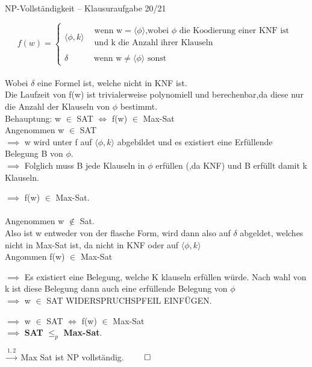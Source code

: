 \documentclass[answers]{submit}
\begin{document}
\begin{exercise}[6]{NP-Vollständigkeit -- Klausuraufgabe 20/21}
{    $$f(w)=\begin{cases}
        \langle \phi,k\rangle &
        \begin{array}{l}
          \text{wenn w} = \langle \phi \rangle \text{,wobei } \phi \text{ die Koodierung einer KNF ist} \\
          \text{und k die Anzahl ihrer Klauseln}                                                        \\
        \end{array} \\
        \delta                & \text{ wenn w} \neq \langle \phi \rangle \text{ sonst}
      \end{cases}$$ \\

    Wobei $\delta$ eine Formel ist, welche nicht in KNF ist. \\

    Die Laufzeit von f(w) ist trivialerweise polynomiell und berechenbar,da diese nur die Anzahl der Klauseln von $\phi$ bestimmt. \\

    Behauptung: w $\in$ SAT $\iff$ f(w) $\in$ Max-Sat \\

    Angenommen w $\in$ SAT\\

    $\implies$ w wird unter f auf $\langle \phi,k\rangle$ abgebildet
    und es existiert eine Erfüllende Belegung B von $\phi$. \\

    $\implies$ Folglich muss B jede Klauseln in $\phi$ erfüllen (,da KNF) und B erfüllt damit k Klauseln.

    $\implies$ f(w) $\in$ Max-Sat. \\ \\

    Angenommen w $\notin$ Sat. \\

    Also ist w entweder von der flasche Form, wird dann also auf $\delta$ abgeldet,
    welches nicht in Max-Sat ist, da nicht in KNF oder auf  $\langle \phi,k\rangle$ \\

    Angommen f(w) $\in $ Max-Sat

    $\implies$ Es existiert eine Belegung, welche K klauseln erfüllen würde.
    Nach wahl von k ist diese Belegung dann auch eine erfüllende Belegung von $\phi$ \\

    $\implies$ w $\in$ SAT WIDERSPRUCHSPFEIL EINFÜGEN.

    $\implies$ w $\in$ SAT $\iff$ f(w) $\in$ Max-Sat \\

    $\implies$ \textbf{SAT} $\leq_p$ \textbf{Max-Sat}.

    $\xrightarrow{1,2}$ Max Sat ist NP vollständig. $\qed$


  }
\end{exercise}
\end{document}

